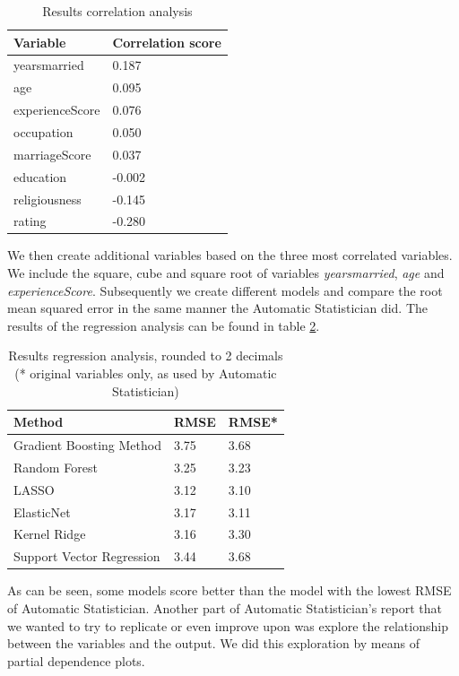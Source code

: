 \documentclass[a4paper, 10pt, conference]{ieeeconf}
\begin{document}
\begin{table}[!h]
\centering
\begin{tabular}{| l | l |}
  \hline
  Variable & Correlation score \\
  \hline
  yearsmarried &      0.187 \\
  age &               0.095 \\
  experienceScore &   0.076 \\
  occupation &        0.050 \\
  marriageScore &     0.037 \\
  education &        -0.002 \\
  religiousness &    -0.145 \\
  rating &           -0.280 \\
  \hline
\end{tabular}
\caption{Results correlation analysis}
\label{table:correlation_affairs}
\end{table}

We then create additional variables based on the three most correlated variables. We include the square, cube and square root of variables \textit{yearsmarried}, \textit{age} and \textit{experienceScore}. Subsequently we create different models and compare the root mean squared error in the same manner the Automatic Statistician did. The results of the regression analysis can be found in table \ref{table:results_affairs}.

\begin{table}[!h]
\centering
\begin{tabular}{| l | l | l |}
  \hline
  Method & RMSE & RMSE* \\
  \hline
  Gradient Boosting Method & 3.75 & 3.68 \\
  Random Forest & 3.25 & 3.23 \\
  LASSO & 3.12 & 3.10 \\
  ElasticNet & 3.17 & 3.11 \\
  Kernel Ridge & 3.16 & 3.30 \\
  Support Vector Regression & 3.44 & 3.68 \\
  \hline
\end{tabular}
\caption{Results regression analysis, rounded to 2 decimals (* original variables only, as used by Automatic Statistician)}
\label{table:results_affairs}
\end{table}

As can be seen, some models score better than the model with the lowest RMSE of Automatic Statistician. Another part of Automatic Statistician's report that we wanted to try to replicate or even improve upon was explore the relationship between the variables and the output. We did this exploration by means of partial dependence plots.
\end{document}
